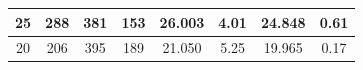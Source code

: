 \begin{landscape}
\begin{table}[]
\begin{tabular}{|c|c|c|c|c|c|c|c|}
25                                                                        & 288                                                           & 381                                                            & 153                                                            & 26.003                                                              & 4.01                  & 24.848           & 0.61                  \\ \hline
20                                                                        & 206                                                           & 395                                                            & 189                                                            & 21.050                                                              & 5.25                  & 19.965           & 0.17                  \\ \hline
\end{tabular}

\end{table}
\end{landscape}
